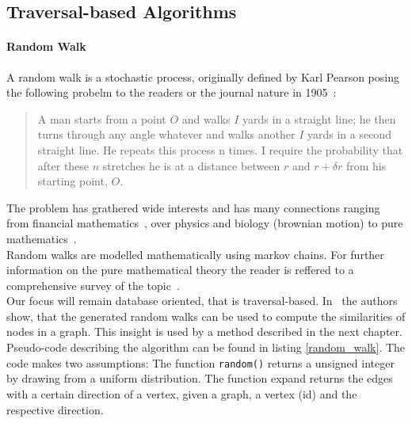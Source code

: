     \subsection{Traversal-based Algorithms}\label{\positionnumber}
        \paragraph{Random Walk}
            A random walk is a stochastic process, originally defined by Karl Pearson posing the following probelm to the readers or the journal nature in 1905~\autocite{pearson1905problem}: 
            \begin{quote}
                A man starts from a point $O$ and walks $I$ yards in a straight line; he then turns through any angle whatever and walks another $I$ yards in a second straight line. He repeats this process n times. I require the probability that after these $n$ stretches he is at a distance between $r$ and $r + \delta r$ from his starting point, $O$.
            \end{quote}
            The problem has grathered wide interests and has many connections ranging from financial mathematics~\autocite{bachelier1900theorie}, over physics and biology (brownian motion\autocite{brown1828xxvii}) to pure mathematics~\autocite{wiener1976collected}. \\
            
            Random walks are modelled mathematically using markov chains.            
            For further information on the pure mathematical theory the reader is reffered to a comprehensive survey of the topic~\autocite{lovasz1993random}. \\
            
            Our focus will remain database oriented, that is traversal-based.
            In~\autocite{fouss2007random} the authors show, that the generated random walks can be used to compute the similarities of nodes in a graph. 
            This insight is used by a method described in the next chapter. \\
            
            Pseudo-code describing the algorithm can be found in listing \ref{random_walk}. The code makes two assumptions: The function \texttt{random()} returns a unsigned integer by drawing from a uniform distribution. The function expand returns the edges with a certain direction of a vertex, given a graph, a vertex (id) and the respective direction. \\
            
